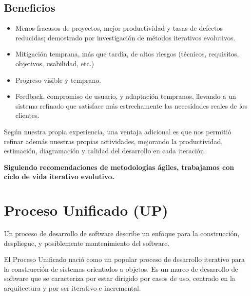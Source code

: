 \subsection{Beneficios}
\begin{itemize}
    \item Menos fracasos de proyectos, mejor productividad y tasas de defectos reducidas; demostrado por investigación de métodos iterativos evolutivos.
    \item Mitigación temprana, más que tardía, de altos riesgos (técnicos, requisitos, objetivos, usabilidad, etc.)
    \item Progreso visible y temprano.
    \item Feedback, compromiso de usuario, y adaptación tempranos, llevando a un sistema refinado que satisface más estrechamente las necesidades reales de los clientes.
\end{itemize}

Según nuestra propia experiencia, una ventaja adicional es que nos permitió refinar además nuestras propias actividades, mejorando la productividad, estimación, diagramación y calidad del desarrollo en cada iteración.

\textbf{Siguiendo recomendaciones de metodologías ágiles, trabajamos con ciclo de vida iterativo evolutivo.}

\section{Proceso Unificado (UP)}

Un proceso de desarrollo de software describe un enfoque para la construcción, despliegue, y posiblemente mantenimiento del software.

El Proceso Unificado nació como un popular proceso de desarrollo iterativo para la construcción de sistemas orientados a objetos. Es un marco de desarrollo de software que se caracteriza por estar dirigido por casos de uso, centrado en la arquitectura y por ser iterativo e incremental.\\[5cm]

